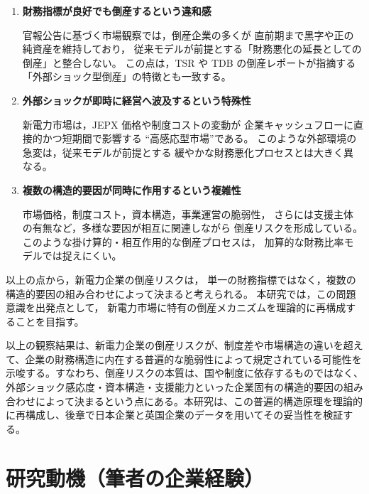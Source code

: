 \begin{enumerate}
    \item \textbf{財務指標が良好でも倒産するという違和感}\par
          官報公告に基づく市場観察では，倒産企業の多くが
          直前期まで黒字や正の純資産を維持しており，
          従来モデルが前提とする「財務悪化の延長としての倒産」と整合しない。
          この点は，TSR や TDB の倒産レポートが指摘する
          「外部ショック型倒産」の特徴とも一致する。

    \item \textbf{外部ショックが即時に経営へ波及するという特殊性}\par
          新電力市場は，JEPX 価格や制度コストの変動が
          企業キャッシュフローに直接的かつ短期間で影響する
          “高感応型市場”である。
          このような外部環境の急変は，従来モデルが前提とする
          緩やかな財務悪化プロセスとは大きく異なる。

    \item \textbf{複数の構造的要因が同時に作用するという複雑性}\par
          市場価格，制度コスト，資本構造，事業運営の脆弱性，
          さらには支援主体の有無など，多様な要因が相互に関連しながら
          倒産リスクを形成している。
          このような掛け算的・相互作用的な倒産プロセスは，
          加算的な財務比率モデルでは捉えにくい。
\end{enumerate}

以上の点から，新電力企業の倒産リスクは，
単一の財務指標ではなく，複数の構造的要因の組み合わせによって決まると考えられる。
本研究では，この問題意識を出発点として，
新電力市場に特有の倒産メカニズムを理論的に再構成することを目指す。

以上の観察結果は、新電力企業の倒産リスクが、制度差や市場構造の違いを超えて、企業の財務構造に内在する普遍的な脆弱性によって規定されている可能性を示唆する。すなわち、倒産リスクの本質は、国や制度に依存するものではなく、外部ショック感応度・資本構造・支援能力といった企業固有の構造的要因の組み合わせによって決まるという点にある。本研究は、この普遍的構造原理を理論的に再構成し、後章で日本企業と英国企業のデータを用いてその妥当性を検証する。



\section{研究動機（筆者の企業経験）}

